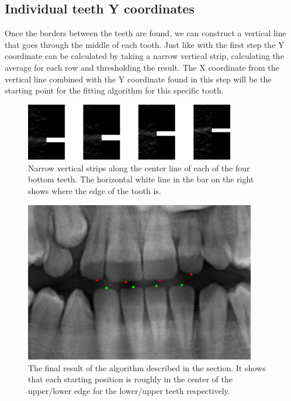\documentclass[a4paper,10pt]{article}
\begin{document}
\subsection{Individual teeth Y coordinates}
Once the borders between the teeth are found, we can construct a vertical line that goes through the middle of each tooth. Just like with the first step the Y coordinate can be calculated by taking a narrow vertical strip, calculating the average for each row and thresholding the result. The X coordinate from the vertical line combined with the Y coordinate found in this step will be the starting point for the fitting algorithm for this specific tooth.

\begin{figure}[]
\centering
\includegraphics[height=25mm]{teeth_vertical_individual.png}
 \caption{Narrow vertical strips along the center line of each of the four bottom teeth. The horizontal white line in the bar on the right shows where the edge of the tooth is.}
\end{figure}
 


\begin{figure}[]
\centering
\includegraphics[height=70mm]{starting_positions.png}
 \caption{The final result of the algorithm described in the section. It shows that each starting position is roughly in the center of the upper/lower edge for the lower/upper teeth respectively.}
\end{figure}

\newpage
\end{document}
